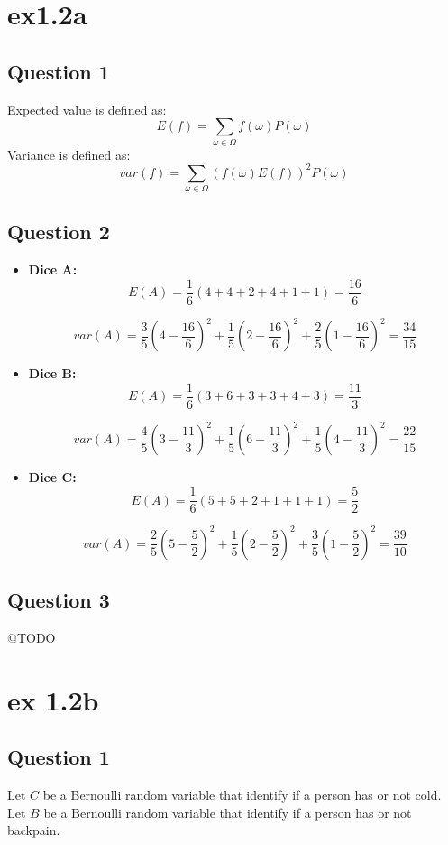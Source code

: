 \section{ex1.2a}
\subsection{Question 1}
Expected value is defined as:
$$E(f) = \sum_{\omega \in \Omega} f(\omega)P(\omega)$$
Variance is defined as:
$$var(f) = \sum_{\omega \in \Omega} (f(\omega)E(f))^2P(\omega)$$

\subsection{Question 2}
\begin{itemize}
	\item \textbf{Dice A: } \newline
	$$
		E(A) = \frac{1}{6} (4+4+2+4+1+1 ) = \frac{16}{6}
	$$
		
	$$
		var(A) = \frac{3}{5}(4-\frac{16}{6})^2 + \frac{1}{5}(2-\frac{16}{6})^2 + \frac{2}{5}(1-\frac{16}{6})^2 = \frac{34}{15}
	$$

	\item \textbf{Dice B: } \newline
	$$
		E(A) = \frac{1}{6} (3+6+3+3+4+3) = \frac{11}{3}
	$$
		
	$$
		var(A) = \frac{4}{5}(3-\frac{11}{3})^2 + 
			\frac{1}{5}(6-\frac{11}{3})^2 + 
			\frac{1}{5}(4-\frac{11}{3})^2 = \frac{22}{15}
	$$

	\item \textbf{Dice C: } \newline
	$$
		E(A) = \frac{1}{6} (5+5+2+1+1+1) = \frac{5}{2}
	$$
		
	$$
		var(A) = \frac{2}{5}(5-\frac{5}{2})^2 + 
			\frac{1}{5}(2-\frac{5}{2})^2 + 
			\frac{3}{5}(1-\frac{5}{2})^2 = \frac{39}{10}
	$$
\end{itemize}

\subsection{Question 3}
	@TODO

\section{ex 1.2b}
	
\subsection{Question 1}
Let $C$ be a Bernoulli random variable that identify if a person has or not cold. \\
Let $B$ be a Bernoulli random variable that identify if a person has or not backpain. 
